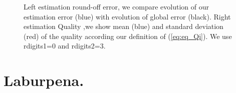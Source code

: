\begin{figure}[h]
\centering
{}
\caption[N-Body: birbiltze errorearen estimazioa.]{\small Left estimation round-off error, we compare evolution of our estimation error (blue) with evolution of global error (black). Right estimation Quality ,we show mean (blue) and  standard deviation (red) of the quality according our definition of (\ref{eq:eq_Qi}). We use rdigits1=0 and rdigits2=3.}
\label{fig:nbody2}
\end{figure}

\section{Laburpena.}
